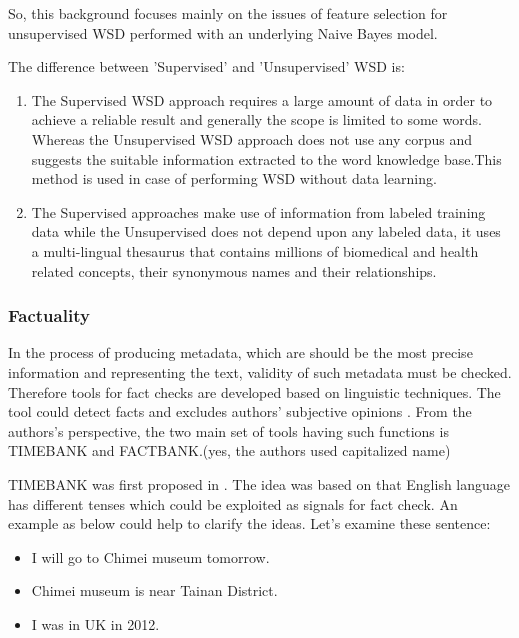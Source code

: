So, this background focuses mainly on the issues of feature selection for unsupervised WSD performed with an underlying Naive Bayes model.

The difference between 'Supervised' and 'Unsupervised' WSD is:

\begin{enumerate}
	\item The Supervised WSD approach requires a large amount of data in order to achieve a reliable result and generally the scope is limited to some words. Whereas the Unsupervised WSD approach does not use any corpus and suggests the suitable information extracted to the word knowledge base.This method is used in case of performing WSD without data learning.
	\item The Supervised approaches make use of information from labeled training data while the Unsupervised does not depend upon any labeled data, it uses a multi-lingual thesaurus that contains millions of biomedical and health related concepts, their synonymous names and their relationships.
\end{enumerate}

\subsubsection*{Factuality}

In the process of producing metadata, which are should be the most precise information and representing the text, validity of such metadata must be checked. Therefore tools for fact checks are developed based on linguistic techniques. The tool could detect facts and excludes authors' subjective opinions \cite{Agerri2014}. From the authors's perspective, the two main set of tools having such functions is TIMEBANK and FACTBANK.(yes, the authors used capitalized name)

TIMEBANK was first proposed in \cite{pustejovsky2003timebank}. The idea was based on that English language has different tenses which could be exploited as signals for fact check. An example as below could help to clarify the ideas. Let's examine these sentence:

\begin{itemize}
	\item I will go to Chimei museum tomorrow.
	\item Chimei museum is near Tainan District.
	\item I was in UK in 2012.
\end{itemize}

